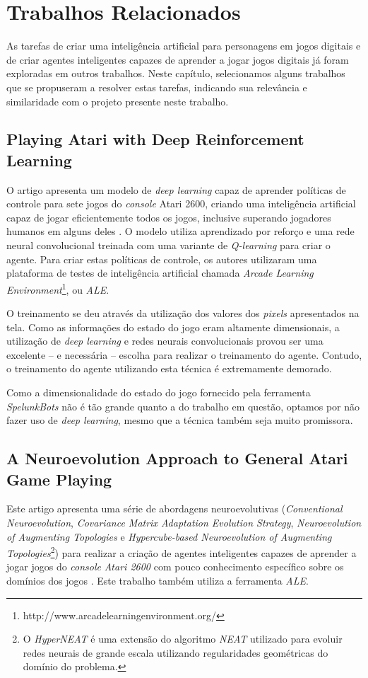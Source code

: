 \chapter{\label{chap:related-work}Trabalhos Relacionados}
As tarefas de criar uma inteligência artificial para personagens em jogos
digitais e de criar agentes inteligentes capazes de aprender a jogar jogos
digitais já foram exploradas em outros trabalhos. Neste capítulo, selecionamos
alguns trabalhos que se propuseram a resolver estas tarefas, indicando sua
relevância e similaridade com o projeto presente neste trabalho. 


\section{Playing Atari with Deep Reinforcement Learning}
O artigo apresenta um modelo de \textit{deep learning} capaz de aprender
políticas de controle para sete jogos do \textit{console} Atari 2600, criando
uma inteligência artificial capaz de jogar eficientemente todos os jogos,
inclusive superando jogadores humanos em alguns deles
\cite{DBLP:journals/corr/MnihKSGAWR13}. O modelo utiliza aprendizado por reforço
e uma rede neural convolucional treinada com uma variante de \textit{Q-learning}
para criar o agente. Para criar estas políticas de controle, os autores
utilizaram uma plataforma de testes de inteligência artificial chamada
\textit{Arcade Learning
Environment}\footnote{http://www.arcadelearningenvironment.org/}, ou
\textit{ALE}.

O treinamento se deu através da utilização dos valores dos \textit{pixels}
apresentados na tela. Como as informações do estado do jogo eram altamente
dimensionais, a utilização de \textit{deep learning} e redes neurais
convolucionais provou ser uma excelente -- e necessária -- escolha para realizar
o treinamento do agente. Contudo, o treinamento do agente utilizando esta
técnica é extremamente demorado.

Como a dimensionalidade do estado do jogo fornecido pela ferramenta
\textit{SpelunkBots} não é tão grande quanto a do trabalho em questão, optamos
por não fazer uso de \textit{deep learning}, mesmo que a técnica também seja
muito promissora.


\section{A Neuroevolution Approach to General Atari Game Playing}
Este artigo apresenta uma série de abordagens neuroevolutivas
(\textit{Conventional Neuroevolution}, \textit{Covariance Matrix Adaptation
Evolution Strategy}, \textit{Neuroevolution of Augmenting Topologies} e
\textit{Hypercube-based Neuroevolution of Augmenting Topologies}\footnote{O
\textit{HyperNEAT} é uma extensão do algoritmo \textit{NEAT} utilizado para
evoluir redes neurais de grande escala utilizando regularidades geométricas do
domínio do problema.}) para realizar a criação de agentes inteligentes capazes
de aprender a jogar jogos do \textit{console} \textit{Atari 2600} com pouco
conhecimento específico sobre os domínios dos jogos \cite{NeuroEvolutionAtari}.
Este trabalho também utiliza a ferramenta \textit{ALE}.

